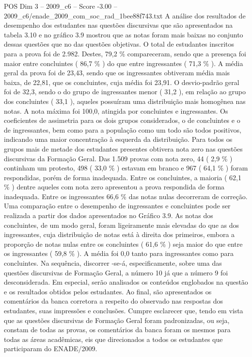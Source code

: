 \begin{textsample}{POS Dim 3 – 2009\_c6 – Score -3.00 – 2009\_c6/enade\_2009\_com\_soc\_rad\_1bee88f743.txt}
A análise dos resultados de desempenho dos estudantes nas questões discursivas que são apresentados na tabela 3.10 e no gráfico 3.9 mostrou que as notas foram mais baixas no conjunto dessas questões que no das questões objetivas.
O total de estudantes inscritos para a prova foi de 2.982.
Destes, 79,2 \% compareceram, sendo que a presença foi maior entre concluintes ( 86,7 \% ) do que entre ingressantes ( 71,3 \% ).
A média geral da prova foi de 23,43, sendo que os ingressantes obtiveram média mais baixa, de 22,81, que os concluintes, cuja média foi 23,91.
O desvio-padrão geral foi de 32,3, sendo o do grupo de ingressantes menor ( 31,2 ), em relação ao grupo dos concluintes ( 33,1 ), aqueles possuíram uma distribuição mais homogênea nas notas.
A nota máxima foi 100,0, atingida por concluintes e ingressantes.
Os coeficientes de assimetria para os dois grupos considerados, o de concluintes e o de ingressantes, bem como para a população como um todo são todos positivos, indicando uma maior concentração à esquerda da distribuição.
Para todos os grupos mais de metade dos estudantes presentes obtivera nota zero nas questões discursivas da Formação Geral.
Das 1.509 provas com nota zero, 44 ( 2,9 \% ) continham um protesto, 498 ( 33,0 \% ) estavam em branco e 967 ( 64,1 \% ) foram respondidas, porém de forma inadequada.
Entre os concluintes, a maioria ( 62,1 \% ) dentre aqueles com nota zero apresentou a prova respondida de forma inadequada.
Entre os ingressantes 66,6 \% das notas nulas decorreram de correção.
Uma comparação entre o desempenho de ingressantes e concluintes pode ser realizada a partir dos dados apresentados no Gráfico 3.9.
As notas dos concluintes, de um modo geral, foram ligeiramente mais elevadas do que as dos ingressantes, cuja distribuição de notas está à direita dos primeiros, embora a proporção de notas nulas entre os concluintes ( 61,6 \% ) seja maior do que entre os ingressantes ( 59,8 \% ).
A média foi 0,0 tanto para ingressantes como para concluintes.
Na sequência, discorrer -se-á, especificamente, sobre uma das questões discursivas de Formação Geral, a número 10 já que a número 9 foi desconsiderada.
Em especial, serão analisados os conteúdos englobados na questão e os resultados obtidos pelos estudantes.
Ao final, são apresentados os comentários da banca corretora a respeito do observado nas respostas dos estudantes, suas impressões e conclusões.
Cumpre esclarecer que, tendo em vista que as questões discursivas de Formação Geral foram padronizadas, ou seja, constam de todas as provas, os comentários da banca foram os mesmos para todas as áreas acadêmicas, eis que direcionados a todos os estudantes que participaram do ENADE/2009.

\end{textsample}
